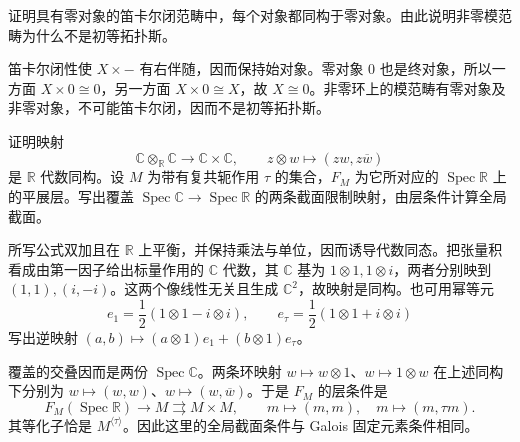 \begin{exercise}\label{b4:ex:E-abelian-topos}
	证明具有零对象的笛卡尔闭范畴中，每个对象都同构于零对象。由此说明非零模范畴为什么不是初等拓扑斯。
\end{exercise}
\begin{solution}
	笛卡尔闭性使 \(X\times-\) 有右伴随，因而保持始对象。零对象 \(0\) 也是终对象，所以一方面 \(X\times0\cong0\)，另一方面 \(X\times0\cong X\)，故 \(X\cong0\)。非零环上的模范畴有零对象及非零对象，不可能笛卡尔闭，因而不是初等拓扑斯。
\end{solution}

\begin{exercise}\label{b4:ex:E-real-etale-overlap}
	证明映射
	\[
		\mathbb C\otimes_{\mathbb R}\mathbb C\longrightarrow\mathbb C\times\mathbb C, \qquad z\otimes w\longmapsto(zw,z\overline w)
	\]
	是 \(\mathbb R\) 代数同构。设 \(M\) 为带有复共轭作用 \(\tau\) 的集合，\(F_M\) 为它所对应的 \(\operatorname{Spec}\mathbb R\) 上的平展层。写出覆盖 \(\operatorname{Spec}\mathbb C\to\operatorname{Spec}\mathbb R\) 的两条截面限制映射，由层条件计算全局截面。
\end{exercise}
\begin{solution}
	所写公式双加且在 \(\mathbb R\) 上平衡，并保持乘法与单位，因而诱导代数同态。把张量积看成由第一因子给出标量作用的 \(\mathbb C\) 代数，其 \(\mathbb C\) 基为 \(1\otimes1,1\otimes i\)，两者分别映到 \((1,1),(i,-i)\)。这两个像线性无关且生成 \(\mathbb C^2\)，故映射是同构。也可用幂等元
	\[
		e_1=\dfrac12(1\otimes1-i\otimes i),\qquad e_\tau=\dfrac12(1\otimes1+i\otimes i)
	\]
	写出逆映射 \((a,b)\mapsto(a\otimes1)e_1+(b\otimes1)e_\tau\)。

	覆盖的交叠因而是两份 \(\operatorname{Spec}\mathbb C\)。两条环映射 \(w\mapsto w\otimes1\)、\(w\mapsto1\otimes w\) 在上述同构下分别为 \(w\mapsto(w,w)\)、\(w\mapsto(w,\overline w)\)。于是 \(F_M\) 的层条件是
	\[
		F_M(\operatorname{Spec}\mathbb R)\longrightarrow M \rightrightarrows M\times M, \qquad m\longmapsto(m,m),\quad m\longmapsto(m,\tau m).
	\]
	其等化子恰是 \(M^{\langle\tau\rangle}\)。因此这里的全局截面条件与 Galois 固定元素条件相同。
\end{solution}


